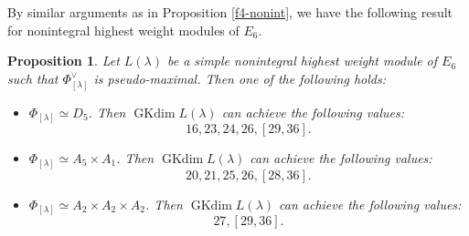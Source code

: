 \documentclass[reqno,12pt]{amsart}
\numberwithin{equation}{section}
\theoremstyle{plain}
\newtheorem{Prop}[Thm]{Proposition}
\theoremstyle{definition}
\newcommand{\lam}{\lambda}
\newcommand{\ep}{\varepsilon}
\renewcommand{\subset}{\subseteq}
\newcommand{\gkd}{\operatorname{GKdim}}
\renewcommand{\geq}{\geqslant}
\begin{document}
By similar arguments as in Proposition \ref{f4-nonint}, we have the following result for nonintegral highest weight modules of $E_6$.
\begin{Prop}\label{e6-non}
Let $L(\lam)$ be a simple nonintegral highest weight module of $E_6$  such that $\Phi_{[\lam]}^\vee$ is pseudo-maximal.
	Then one of 
    the following holds:
    \begin{itemize}
        
	\item[(1)] $\Phi_{[\lam]}\simeq D_5$. Then 
 $ \gkd L(\lam) $ can achieve the following values:
$$16, 23, 24, 26, [29, 36].$$


\item[(2)] $\Phi_{[\lam]}\simeq A_5\times A_1$. Then
$ \gkd L(\lam) $ can achieve the following values:
$$20, 21, 25, 26, [28, 36].$$




            \item[(3)] $\Phi_{[\lam]}\simeq A_2\times A_2\times A_2$. Then
$ \gkd L(\lam) $ can achieve the following values:
$$27,  [29, 36].$$







\end{itemize}
\end{Prop}












\end{document}
